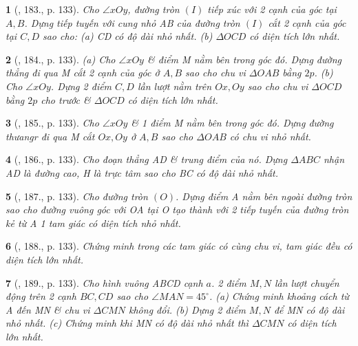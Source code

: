 \documentclass{article}
\newtheorem{baitoan}{}
\begin{document}
\begin{baitoan}[\cite{Binh_Toan_9_tap_1}, 183., p. 133]
	Cho $\angle{xOy}$, đường tròn $(I)$ tiếp xúc với 2 cạnh của góc tại $A,B$. Dựng tiếp tuyến với cung nhỏ AB của đường tròn $(I)$ cắt 2 cạnh của góc tại $C,D$ sao cho: (a) CD có độ dài nhỏ nhất. (b) $\Delta OCD$ có diện tích lớn nhất.
\end{baitoan}

\begin{baitoan}[\cite{Binh_Toan_9_tap_1}, 184., p. 133]
	(a) Cho $\angle{xOy}$ \& điểm M nằm bên trong góc đó. Dựng đường thẳng đi qua M cắt 2 cạnh của góc ở $A,B$ sao cho chu vi $\Delta OAB$ bằng $2p$. (b) Cho $\angle{xOy}$. Dựng 2 điểm $C,D$ lần lượt nằm trên $Ox,Oy$ sao cho chu vi $\Delta OCD$ bằng $2p$ cho trước \& $\Delta OCD$ có diện tích lớn nhất.
\end{baitoan}

\begin{baitoan}[\cite{Binh_Toan_9_tap_1}, 185., p. 133]
	Cho $\angle{xOy}$ \& 1 điểm M nằm bên trong góc đó. Dựng đường thưangr đi qua M cắt $Ox,Oy$ ở $A,B$ sao cho $\Delta OAB$ có chu vi nhỏ nhất.
\end{baitoan}

\begin{baitoan}[\cite{Binh_Toan_9_tap_1}, 186., p. 133]
	Cho đoạn thẳng AD \& trung điểm của nó. Dựng $\Delta ABC$ nhận AD là đường cao, H là trực tâm sao cho BC có độ dài nhỏ nhất.
\end{baitoan}

\begin{baitoan}[\cite{Binh_Toan_9_tap_1}, 187., p. 133]
	Cho đường tròn $(O)$. Dựng điểm A nằm bên ngoài đường tròn sao cho đường vuông góc với OA tại O tạo thành với 2 tiếp tuyến của đường tròn kẻ từ A 1 tam giác có diện tích nhỏ nhất.
\end{baitoan}

\begin{baitoan}[\cite{Binh_Toan_9_tap_1}, 188., p. 133]
	Chứng minh trong các tam giác có cùng chu vi, tam giác đều có diện tích lớn nhất.
\end{baitoan}

\begin{baitoan}[\cite{Binh_Toan_9_tap_1}, 189., p. 133]
	Cho hình vuông ABCD cạnh $a$. 2 điểm $M,N$ lần lượt chuyển động trên 2 cạnh $BC,CD$ sao cho $\angle{MAN} = 45^\circ$. (a) Chứng minh khoảng cách từ A đến MN \& chu vi $\Delta CMN$ không đổi. (b) Dựng 2 điểm $M,N$ để MN có độ dài nhỏ nhất. (c) Chứng minh khi MN có độ dài nhỏ nhất thì $\Delta CMN$ có diện tích lớn nhất.
\end{baitoan}
\end{document}

